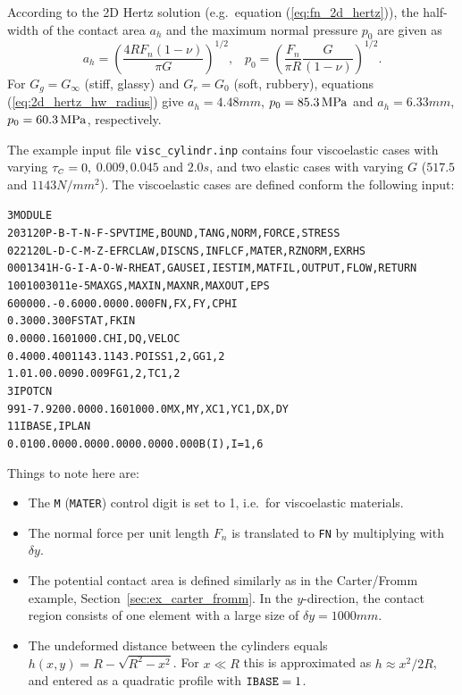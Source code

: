 \documentclass[12pt]{report}
\begin{document}
According to the 2D Hertz solution (e.g.\ equation (\ref{eq:fn_2d_hertz})),
the half-width of the contact area $a_h$ and the maximum normal pressure
$p_0$ are given as
\begin{equation}
\label{eq:2d_hertz_hw_radius}
	a_h = \left( \frac{4 R F_n (1-\nu)}{\pi G}\right)^{1/2}, \;\;\;
	p_0 = \left( \frac{F_n}{\pi R}\frac{G}{(1-\nu)}\right)^{1/2}.
\end{equation}
For $G_g=G_\infty$ (stiff, glassy) and $G_r=G_0$ (soft, rubbery), equations
(\ref{eq:2d_hertz_hw_radius}) give $a_h=4.48\unit{mm}$, $p_0=85.3\,\mathrm{MPa}$ and
$a_h=6.33\unit{mm}$, $p_0=60.3\,\mathrm{MPa}$, respectively.

The example input file {\tt visc\_cylindr.inp} contains four viscoelastic
cases with varying $\tau_{\scriptscriptstyle C}=0,$ $0.009, 0.045$ and $2.0\unit{s}$, and two elastic
cases with varying $G$ ($517.5$ and $1143\unit{N/mm^2}$). The viscoelastic
cases are defined conform the following input:
\begin{alltt}\small
 3  MODULE
  203120     P-B-T-N-F-S        PVTIME, BOUND , TANG  , NORM , FORCE, STRESS
  022120     L-D-C-M-Z-E        FRCLAW, DISCNS, INFLCF, MATER, RZNORM, EXRHS
 0001341   H-G-I-A-O-W-R  HEAT, GAUSEI, IESTIM, MATFIL, OUTPUT, FLOW, RETURN
   100   100    30      1     1e-5     MAXGS , MAXIN , MAXNR , MAXOUT, EPS
 600000.   -0.600    0.000    0.000            FN, FX, FY, CPHI
   0.300    0.300                              FSTAT, FKIN
   0.000    0.160    1000.                     CHI, DQ, VELOC
   0.400    0.400    1143.    1143.            POISS 1,2,  GG 1,2
   1.0      1.0      0.009    0.009            FG 1,2, TC 1,2
    3                                          IPOTCN
  99   1   -7.920   0.000    0.160    1000.0   MX,MY,XC1,YC1,DX,DY
    1    1                                     IBASE, IPLAN
  0.010    0.000     0.000    0.000     0.000     0.000     B(I), I=1, 6
\end{alltt}
Things to note here are:
\begin{itemize}
\item The {\tt M} ({\tt MATER}) control digit is set to 1, i.e.\ for
        viscoelastic materials.
\item The normal force per unit length $F_n$ is translated to {\tt FN}
        by multiplying with $\delta y$.
\item The potential contact area is defined similarly as in the
        Carter/Fromm example, Section~\ref{sec:ex_carter_fromm}. In the
        $y$-direction, the contact region consists of one element with a
        large size of $\delta y=1000\unit{mm}$.
\item The undeformed distance between the cylinders equals
        $h(x,y)=R - \sqrt{R^2-x^2}$. For $x\ll R$ this is
        approximated as $h \approx x^2/2R$, and entered as a quadratic
        profile with ${\tt IBASE}=1$.
\end{itemize}
\end{document}
